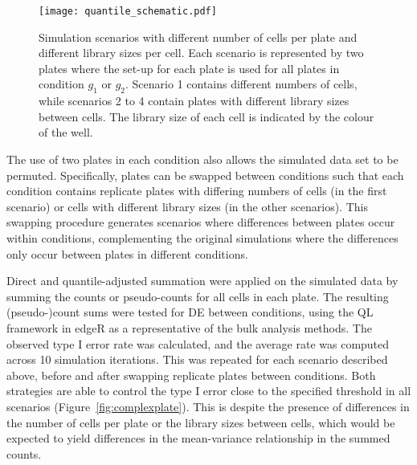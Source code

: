 \documentclass{article}
\begin{document}
\begin{figure}[tb]
    \begin{center}
        \texttt{[image: quantile\_schematic.pdf]}
    \end{center}
    \caption{
        Simulation scenarios with different number of cells per plate and different library sizes per cell.
        Each scenario is represented by two plates where the set-up for each plate is used for all plates in condition $g_1$ or $g_2$.
        Scenario 1 contains different numbers of cells, while scenarios 2 to 4 contain plates with different library sizes between cells.
        The library size of each cell is indicated by the colour of the well.
    }
    \label{fig:compsim}
\end{figure}


The use of two plates in each condition also allows the simulated data set to be permuted.
Specifically, plates can be swapped between conditions such that each condition contains replicate plates with differing numbers of cells (in the first scenario)
    or cells with different library sizes (in the other scenarios).
This swapping procedure generates scenarios where differences between plates occur within conditions, 
    complementing the original simulations where the differences only occur between plates in different conditions.

Direct and quantile-adjusted summation were applied on the simulated data by summing the counts or pseudo-counts for all cells in each plate.
The resulting (pseudo-)count sums were tested for DE between conditions, using the QL framework in edgeR as a representative of the bulk analysis methods.
The observed type I error rate was calculated, and the average rate was computed across 10 simulation iterations.
This was repeated for each scenario described above, before and after swapping replicate plates between conditions.
Both strategies are able to control the type I error close to the specified threshold in all scenarios (Figure~\ref{fig:complexplate}).
This is despite the presence of differences in the number of cells per plate or the library sizes between cells,
    which would be expected to yield differences in the mean-variance relationship in the summed counts.
\end{document}
